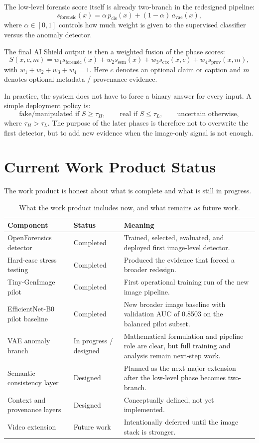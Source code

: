 \documentclass[11pt]{article}
\begin{document}
The low-level forensic score itself is already two-branch in the redesigned pipeline:
\[
s_{\mathrm{forensic}}(x) = \alpha\, p_{\mathrm{cls}}(x) + (1-\alpha)\, a_{\mathrm{vae}}(x),
\]
where \(\alpha\in[0,1]\) controls how much weight is given to the supervised classifier versus the anomaly detector.

The final AI Shield output is then a weighted fusion of the phase scores:
\[
S(x,c,m) = w_1 s_{\mathrm{forensic}}(x) + w_2 s_{\mathrm{sem}}(x) + w_3 s_{\mathrm{ctx}}(x,c) + w_4 s_{\mathrm{prov}}(x,m),
\]
with \(w_1+w_2+w_3+w_4=1\). Here \(c\) denotes an optional claim or caption and \(m\) denotes optional metadata / provenance evidence.

In practice, the system does not have to force a binary answer for every input. A simple deployment policy is:
\[
\text{fake/manipulated if } S\ge \tau_H, \qquad
\text{real if } S\le \tau_L, \qquad
\text{uncertain otherwise},
\]
where \(\tau_H > \tau_L\). The purpose of the later phases is therefore not to overwrite the first detector, but to add new evidence when the image-only signal is not enough.

\section{Current Work Product Status}

The work product is honest about what is complete and what is still in progress.

\begin{table}[H]
\centering
\small
\begin{tabularx}{0.98\textwidth}{>{\raggedright\arraybackslash}p{4.1cm} >{\centering\arraybackslash}p{2.0cm} >{\raggedright\arraybackslash}X}
\toprule
\textbf{Component} & \textbf{Status} & \textbf{Meaning} \\
\midrule
OpenForensics detector & Completed & Trained, selected, evaluated, and deployed first image-level detector. \\
Hard-case stress testing & Completed & Produced the evidence that forced a broader redesign. \\
Tiny-GenImage pilot & Completed & First operational training run of the new image pipeline. \\
EfficientNet-B0 pilot baseline & Completed & New broader image baseline with validation AUC of 0.8503 on the balanced pilot subset. \\
VAE anomaly branch & In progress / designed & Mathematical formulation and pipeline role are clear, but full training and analysis remain next-step work. \\
Semantic consistency layer & Designed & Planned as the next major extension after the low-level phase becomes two-branch. \\
Context and provenance layers & Designed & Conceptually defined, not yet implemented. \\
Video extension & Future work & Intentionally deferred until the image stack is stronger. \\
\bottomrule
\end{tabularx}
\caption{What the work product includes now, and what remains as future work.}
\end{table}
\end{document}
